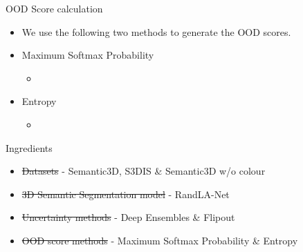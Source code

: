 \documentclass[aspectratio=169]{beamer}
\begin{document}
\begin{frame}{OOD Score calculation}
    \begin{itemize}
        \item We use the following two methods to generate the OOD scores.
        \item Maximum Softmax Probability
        \begin{itemize}
            \item 
        \end{itemize}
        \item Entropy
        \begin{itemize}
            \item 
        \end{itemize}
    \end{itemize}
\end{frame}
\begin{frame}{Ingredients}
    \begin{itemize}
        \item \st{Datasets} - Semantic3D, S3DIS \& Semantic3D w/o colour
        \item \st{3D Semantic Segmentation model} - RandLA-Net
        \item \st{Uncertainty methods} - Deep Ensembles \& Flipout
        \item \st{OOD score methods} - Maximum Softmax Probability \& Entropy
    \end{itemize}
\end{frame}
\end{document}
